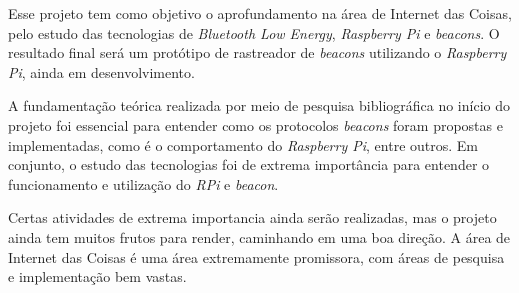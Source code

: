 \documentclass[
	12pt,				%
	openright,			%
	oneside,			%
	a4paper,			%
	chapter=TITLE,		%
	english,			%
	brazil				%
	]{abntex2}
\begin{document}
{Esse projeto tem como objetivo o aprofundamento na área de Internet das Coisas, pelo estudo das tecnologias de \textit{Bluetooth Low Energy}, \textit{Raspberry Pi} e \textit{beacons}. O resultado final será um protótipo de rastreador de \textit{beacons} utilizando o \textit{Raspberry Pi}, ainda em desenvolvimento.

A fundamentação teórica realizada por meio de pesquisa bibliográfica no início do projeto foi essencial para entender como os protocolos \textit{beacons} foram propostas e implementadas, como é o comportamento do \textit{Raspberry Pi}, entre outros. Em conjunto, o estudo das tecnologias foi de extrema importância para entender o funcionamento e utilização do \textit{RPi} e \textit{beacon}.

Certas atividades de extrema importancia ainda serão realizadas, mas o projeto ainda tem muitos frutos para render, caminhando em uma boa direção. A área de Internet das Coisas é uma área extremamente promissora, com áreas de pesquisa e implementação bem vastas. 













}
\end{document}
